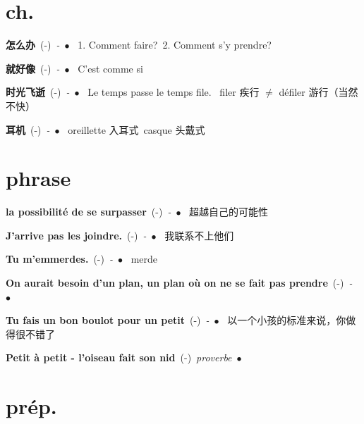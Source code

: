 \documentclass[10pt,a4paper,twoside]{article} %
\newcommand{\entry}[4]{\textbf{#1}\ {(#2)}\ \textit{#3}\ $\bullet$\ {#4}} %
\begin{document}
\begin{CJK*}{UTF8}{gkai}
\section*{ch.}

\begin{multicols}{2}

\entry{怎么办}{-}{-}
{
1. Comment faire?\ 
2. Comment s'y prendre?\ 
}

\entry{就好像}{-}{-}
{
C'est comme si 
}

\entry{时光飞逝}{-}{-}
{
Le temps passe le temps file. \ 
filer 疾行 $\neq$ défiler 游行（当然不快） 
}

\entry{耳机}{-}{-}
{
oreillette 入耳式\ 
casque     头戴式 
}

\end{multicols}



\section*{phrase}

\begin{multicols}{2}

\entry{la possibilité de se surpasser}{-}{-}
{
超越自己的可能性
}

\entry{J'arrive pas les joindre.}{-}{-}
{
我联系不上他们
}

\entry{Tu m'emmerdes.}{-}{-}
{
merde
}

\entry{On aurait besoin d'un plan, un plan o\`u on ne se fait pas prendre}{-}{-}
{
}

\entry{Tu fais un bon boulot pour un petit}{-}{-}
{
以一个小孩的标准来说，你做得很不错了
}

\entry{Petit à petit - l'oiseau fait son nid}{-}{proverbe}
{
}

\end{multicols}


\section*{prép.}


\end{CJK*}
\end{document}
